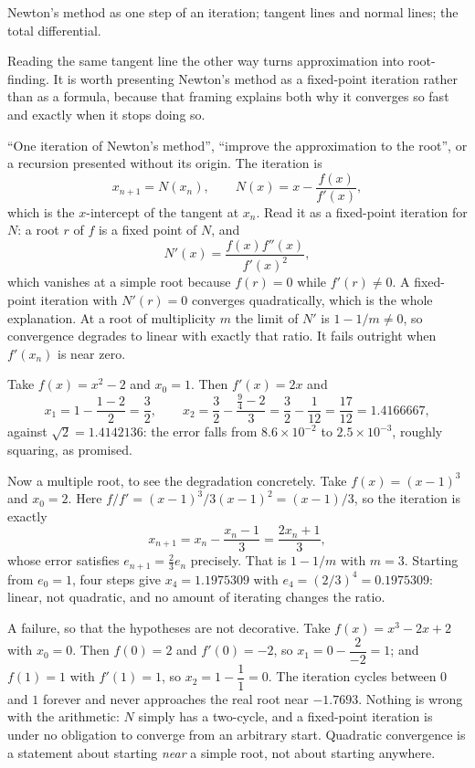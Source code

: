 \begin{seealsob}Newton's method as one step of an iteration; tangent lines and normal lines; the total differential.\end{seealsob}

Reading the same tangent line the other way turns approximation into root-finding. It is worth presenting Newton's method as a fixed-point iteration rather than as a formula, because that framing explains both why it converges so fast and exactly when it stops doing so.

\cue ``One iteration of Newton's method'', ``improve the approximation to the root'', or a recursion presented without its origin.
\method The iteration is
\[
x_{n+1}=N(x_{n}),\qquad N(x)=x-\frac{f(x)}{f'(x)} ,
\]
which is the $x$-intercept of the tangent at $x_{n}$. Read it as a fixed-point iteration for $N$: a root $r$ of $f$ is a fixed point of $N$, and
\[
N'(x)=\frac{f(x)f''(x)}{f'(x)^{2}} ,
\]
which vanishes at a simple root because $f(r)=0$ while $f'(r)\neq0$. A fixed-point iteration with $N'(r)=0$ converges quadratically, which is the whole explanation. At a root of multiplicity $m$ the limit of $N'$ is $1-1/m\neq0$, so convergence degrades to linear with exactly that ratio. It fails outright when $f'(x_{n})$ is near zero.

\begin{worked}
Take $f(x)=x^{2}-2$ and $x_{0}=1$. Then $f'(x)=2x$ and
\[
x_{1}=1-\frac{1-2}{2}=\frac32,\qquad x_{2}=\frac32-\frac{\tfrac94-2}{3}=\frac32-\frac{1}{12}=\frac{17}{12}=1.4166667 ,
\]
against $\sqrt2=1.4142136$: the error falls from $8.6\times10^{-2}$ to $2.5\times10^{-3}$, roughly squaring, as promised.

Now a multiple root, to see the degradation concretely. Take $f(x)=(x-1)^{3}$ and $x_{0}=2$. Here $f/f'=(x-1)^{3}/3(x-1)^{2}=(x-1)/3$, so the iteration is exactly
\[
x_{n+1}=x_{n}-\frac{x_{n}-1}{3}=\frac{2x_{n}+1}{3},
\]
whose error satisfies $e_{n+1}=\tfrac23e_{n}$ precisely. That is $1-1/m$ with $m=3$. Starting from $e_{0}=1$, four steps give $x_{4}=1.1975309$ with $e_{4}=(2/3)^{4}=0.1975309$: linear, not quadratic, and no amount of iterating changes the ratio.

A failure, so that the hypotheses are not decorative. Take $f(x)=x^{3}-2x+2$ with $x_{0}=0$. Then $f(0)=2$ and $f'(0)=-2$, so $x_{1}=0-\dfrac{2}{-2}=1$; and $f(1)=1$ with $f'(1)=1$, so $x_{2}=1-\dfrac11=0$. The iteration cycles between $0$ and $1$ forever and never approaches the real root near $-1.7693$. Nothing is wrong with the arithmetic: $N$ simply has a two-cycle, and a fixed-point iteration is under no obligation to converge from an arbitrary start. Quadratic convergence is a statement about starting \emph{near} a simple root, not about starting anywhere.
\end{worked}

